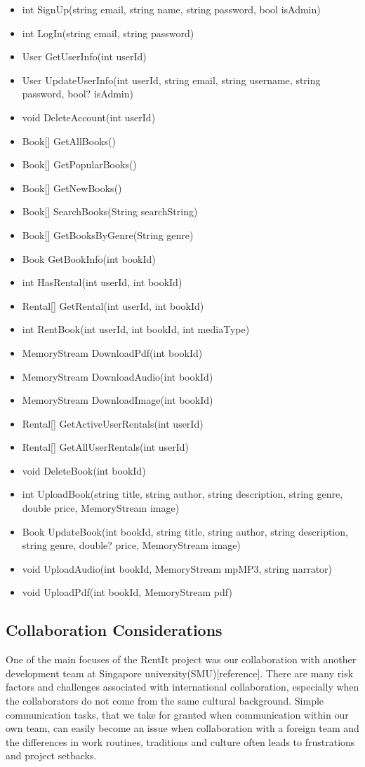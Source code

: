 \documentclass[a4paper,11pt,report]{article}
\begin{document}
\begin{itemize}
	\item int SignUp(string email, string name, string password, bool isAdmin)
	\item int LogIn(string email, string password)
	\item User GetUserInfo(int userId)
	\item User UpdateUserInfo(int userId, string email, string username, string password, bool? isAdmin)
	\item void DeleteAccount(int userId)
	\item Book[] GetAllBooks()
	\item Book[] GetPopularBooks()
	\item Book[] GetNewBooks()
	\item Book[] SearchBooks(String searchString)
	\item Book[] GetBooksByGenre(String genre)
	\item Book GetBookInfo(int bookId)
	\item int HasRental(int userId, int bookId)
	\item Rental[] GetRental(int userId, int bookId)
	\item int RentBook(int userId, int bookId, int mediaType)
	\item MemoryStream DownloadPdf(int bookId)
	\item MemoryStream DownloadAudio(int bookId)
	\item MemoryStream DownloadImage(int bookId)
	\item Rental[] GetActiveUserRentals(int userId)
	\item Rental[] GetAllUserRentals(int userId)
	\item void DeleteBook(int bookId)
	\item int UploadBook(string title, string author, string description, string genre, double price, MemoryStream image)
	\item Book UpdateBook(int bookId, string title, string author, string description, string genre, double? price, MemoryStream image)
	\item void UploadAudio(int bookId, MemoryStream mpMP3, string narrator)
	\item void UploadPdf(int bookId, MemoryStream pdf)
\end{itemize}

\subsection{Collaboration Considerations}
One of the main focuses of the RentIt project was our collaboration with another development team at Singapore university(SMU)[reference]. There are many risk factors and challenges associated with international collaboration, especially when the collaborators do not come from the same cultural background. Simple communication tasks, that we take for granted when communication within our own team, can easily become an issue when collaboration with a foreign team and the differences in work routines, traditions and culture often leads to frustrations and project setbacks. \\
\end{document}
